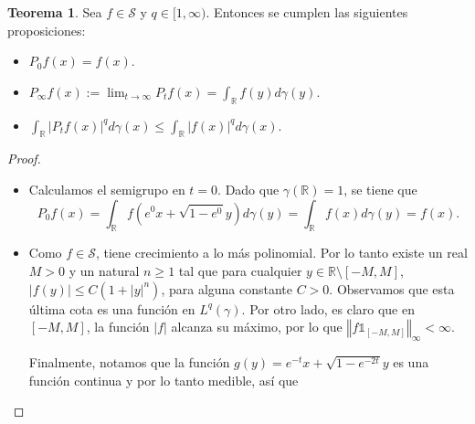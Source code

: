 \documentclass[letterpaper,twoside,12pt]{book}
\newcommand{\R}{\mathbb{R}}
\renewcommand{\S}{\mathcal{S}}
\newcommand{\1}{\mathds{1}}
\newcommand{\abs}[1]{\left\lvert #1 \right\rvert}
\renewcommand{\to}{\rightarrow}
\newcommand{\norm}[1]{\left\Vert #1 \right\Vert}
\theoremstyle{definition}
\theoremstyle{definition}
\newtheorem{teo}{Teorema}
\theoremstyle{remark}
\theoremstyle{definition}
\theoremstyle{definition}
\theoremstyle{definition}
\theoremstyle{definition}
\theoremstyle{definition}
\begin{document}
\begin{teo}
   Sea $f\in \mathcal{S}$ y $q\in [1,\infty)$. Entonces se cumplen las siguientes proposiciones:
   \begin{itemize}
       \item $P_0f(x)=f(x)$.
       \item $P_\infty f(x):=\displaystyle\lim_{t\to\infty}P_tf(x)=\int_\R f(y)d\gamma(y)$.
       \item $\displaystyle\int_\R \abs{P_tf(x)}^qd\gamma(x)\leq \int_\R\abs{f(x)}^qd\gamma(x)$.
   \end{itemize}
\end{teo}
\begin{proof} 
  \begin{itemize}
   \item  Calculamos el semigrupo en $t=0$. Dado que $\gamma(\R)=1$, se tiene que 
    \[
    P_0f(x)=\int_\R f\left(e^{0}x+\sqrt{1-e^{0}}y\right)d\gamma(y)=\int_\R f(x)d\gamma(y)=f(x).
    \]
    \item Como $f\in \S$, tiene crecimiento a lo más polinomial. Por lo tanto existe un real $M>0$ y un natural $n\geq1$ tal que para cualquier $y\in \R\setminus[-M,M]$, $|f(y)|\leq C(1+|y|^n)$, para alguna constante $C>0$. Observamos que esta última cota es una función en $L^q(\gamma)$. Por otro lado, es claro que en $[-M,M]$, la función $|f|$ alcanza su máximo, por lo que $\norm{f\1_{[-M,M]}}_\infty<\infty$. 
    
    Finalmente, notamos que la función $g(y)=e^{-t}x+\sqrt{1-e^{-2t}}y$ es una función continua y por lo tanto medible, así que
    

\end{itemize}
\end{proof}
\end{document}

